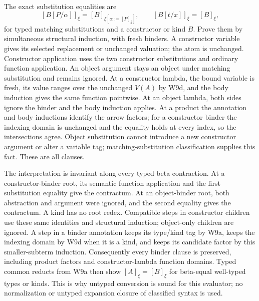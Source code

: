 The exact substitution equalities are
\[
 [B[P/\alpha]]_\xi=[B]_{\xi[\alpha:=[P]_\xi]},\qquad
 [B[t/x]]_\xi=[B]_\xi,
\]
for typed matching substitutions and a constructor or kind \(B\).
Prove them by simultaneous structural induction, with fresh binders.
A constructor variable gives its selected replacement or unchanged
valuation; the atom is unchanged. Constructor application uses the two
constructor substitutions and ordinary function application. An object
argument stays an object under matching substitution and remains ignored.
At a constructor lambda, the bound variable is fresh, its value ranges
over the unchanged \(V(A)\) by W9d, and the body induction gives the
same function pointwise. At an object lambda, both sides ignore the
binder and the body induction applies. At a product the annotation and
body inductions identify the arrow factors; for a constructor binder the
indexing domain is unchanged and the equality holds at every index, so
the intersections agree. Object substitution cannot introduce a new
constructor argument or alter a variable tag; matching-substitution
classification supplies this fact. These are all clauses.

The interpretation is invariant along every typed beta contraction.
At a constructor-binder root, its semantic function application and the
first substitution equality give the contractum. At an object-binder
root, both abstraction and argument were ignored, and the second equality
gives the contractum. A kind has no root redex. Compatible steps in
constructor children use these same identities and structural induction;
object-only children are ignored. A step in a binder annotation keeps
its type/kind tag by W9a, keeps the indexing domain by W9d when it is a
kind, and keeps its candidate factor by this smaller-subterm induction.
Consequently every binder clause is preserved, including product factors
and constructor-lambda function domains. Typed common reducts from W9a
then show \([A]_\xi=[B]_\xi\) for beta-equal well-typed types or
kinds. This is why untyped conversion is sound for this evaluator; no
normalization or untyped expansion closure of classified syntax is used.

